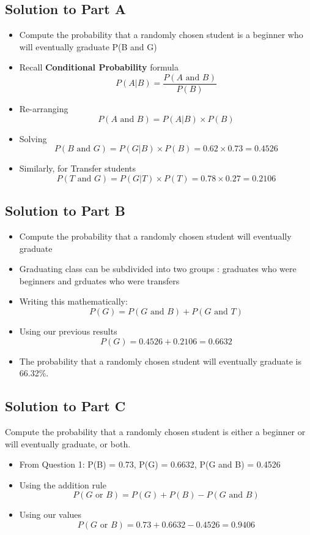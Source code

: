 \documentclass[a4paper,12pt]{article}
\begin{document}
\subsection*{Solution to Part A}
\begin{itemize}
	\item Compute the probability that a randomly chosen student is a beginner who will
	eventually graduate P(B and G)
	\item Recall \textbf{Conditional Probability} formula
	\[P(A|B) = \frac{P(A \mbox{ and } B)}{P(B)}\]
	\item Re-arranging
	\[P(A \mbox{ and } B) = P(A|B)\times P(B)  \]
	\item Solving
	\[P(B \mbox{ and } G) = P(G|B)\times P(B) = 0.62 \times 0.73  = 0.4526 \]
	\item Similarly, for Transfer students
	\[P(T \mbox{ and } G) = P(G|T)\times P(T) = 0.78 \times 0.27  = 0.2106 \]
\end{itemize} 

\subsection*{Solution to Part B}
\begin{itemize}
	\item Compute the probability that a randomly chosen student will eventually graduate
	\item Graduating class can be subdivided into two groups : graduates who were beginners and grduates who were transfers
	\item Writing this mathematically:
	\[P(G) = P(G \mbox{ and } B) + P(G \mbox{ and } T) \]
	\item Using our previous results
	\[P(G) = 0.4526 + 0.2106 = 0.6632 \]
	\item The probability that a randomly chosen student will eventually graduate is 66.32\%.
\end{itemize} 

\subsection*{Solution to Part C}
\noindent Compute the probability that a randomly chosen student is either a beginner or will
eventually graduate, or both.
\begin{itemize}
	\item From Question 1: P(B) = 0.73, P(G) = 0.6632, P(G and B) = 0.4526
	\item Using the addition rule
	\[P(G \mbox{ or } B) = P(G) + P(B) - P(G \mbox{ and } B)\]
	\item Using our values
	\[P(G \mbox{ or } B) = 0.73 + 0.6632 - 0.4526 = 0.9406\]
\end{itemize}
\end{document}
